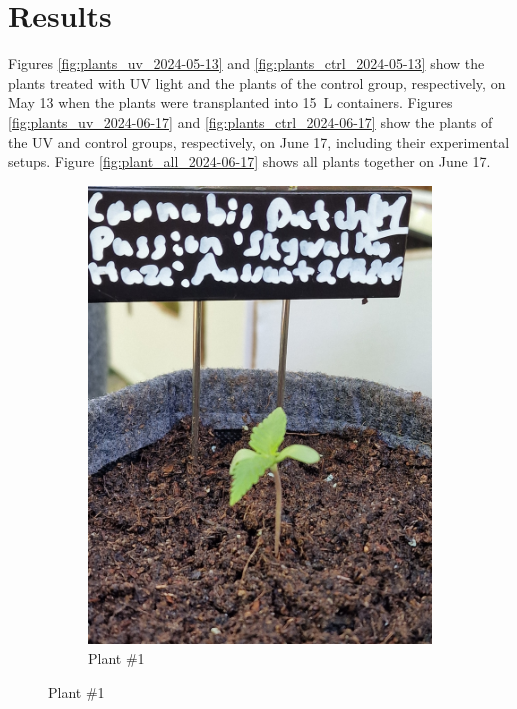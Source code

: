 \section{Results}

Figures \ref{fig:plants_uv_2024-05-13} and \ref{fig:plants_ctrl_2024-05-13} show the plants treated with UV light and the plants of the control group, respectively, on May 13 when the plants were transplanted into \qty[mode=text]{15}{\L} containers. Figures \ref{fig:plants_uv_2024-06-17} and \ref{fig:plants_ctrl_2024-06-17} show the plants of the UV and control groups, respectively, on June 17, including their experimental setups. Figure \ref{fig:plant_all_2024-06-17} shows all plants together on June 17.

\begin{figure}[htbp]
    \begin{subfigure}[t]{.15\textwidth}
        \includegraphics[width=\linewidth]{plant_01_2024-05-13}
        \caption{Plant \#1}
        \label{fig:plant_01_2024-05-13}

\end{subfigure}
\end{figure}
